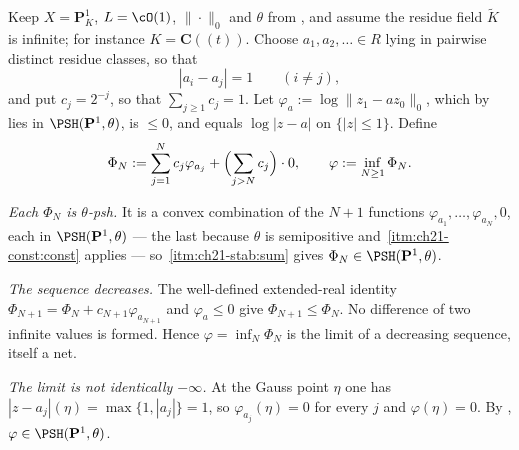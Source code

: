 \begin{example}
\label{ex:ch21-polar-noncompact}
Keep $X=\mathbf P^1_K$, $L=\cO(1)$, $\|\cdot\|_0$ and $\theta$ from
, and assume the residue field
$\widetilde K$ is infinite; for instance $K=\mathbf C((t))$.  Choose
$a_1,a_2,\ldots\in R$ lying in pairwise distinct residue classes, so that
\begin{equation}
\label{eq:ch21-separated-centres}
 |a_i-a_j|=1\qquad(i\neq j),
\end{equation}
and put $c_j=2^{-j}$, so that $\sum_{j\geq1}c_j=1$.  Let
$\varphi_{a}:=\log\lVert z_1-az_0\rVert_0$, which by
 lies in $\PSH(\mathbf P^1,\theta)$, is
$\leq0$, and equals $\log|z-a|$ on $\{|z|\leq1\}$.  Define
\begin{equation}
\label{eq:ch21-polar-series}
 \Phi_N:=\sum_{j=1}^{N}c_j\varphi_{a_j}
        +\Bigl(\sum_{j>N}c_j\Bigr)\cdot 0,
 \qquad
 \varphi:=\inf_{N\geq1}\Phi_N .
\end{equation}

\emph{Each $\Phi_N$ is $\theta$-psh.}  It is a convex combination of the
$N+1$ functions $\varphi_{a_1},\ldots,\varphi_{a_N},0$, each in
$\PSH(\mathbf P^1,\theta)$ --- the last because $\theta$ is semipositive
and \,\cref{itm:ch21-const:const} applies --- so
\,\cref{itm:ch21-stab:sum} gives
$\Phi_N\in\PSH(\mathbf P^1,\theta)$.

\emph{The sequence decreases.}  The well-defined extended-real identity
$\Phi_{N+1}=\Phi_N+c_{N+1}\varphi_{a_{N+1}}$ and
$\varphi_a\leq0$ give $\Phi_{N+1}\leq\Phi_N$.
No difference of two infinite values is formed.  Hence $\varphi=\inf_N\Phi_N$ is the limit of a
decreasing sequence, itself a net.

\emph{The limit is not identically $-\infty$.}  At the Gauss point
$\eta$ one has $|z-a_j|(\eta)=\max\{1,|a_j|\}=1$, so
$\varphi_{a_j}(\eta)=0$ for every $j$ and $\varphi(\eta)=0$.  By
,
$\varphi\in\PSH(\mathbf P^1,\theta)$.


\end{example}
